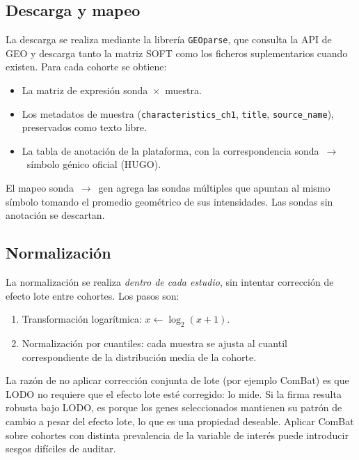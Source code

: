 \subsection{Descarga y mapeo}
\label{sec:descarga}

La descarga se realiza mediante la librería \texttt{GEOparse}, que consulta
la API de GEO y descarga tanto la matriz SOFT como los ficheros
suplementarios cuando existen. Para cada cohorte se obtiene:

\begin{itemize}
  \item La matriz de expresión sonda~$\times$~muestra.
  \item Los metadatos de muestra (\texttt{characteristics\_ch1},
  \texttt{title}, \texttt{source\_name}), preservados como texto libre.
  \item La tabla de anotación de la plataforma, con la correspondencia
  sonda~$\to$~símbolo génico oficial (HUGO).
\end{itemize}

El mapeo sonda~$\to$~gen agrega las sondas múltiples que apuntan al mismo
símbolo tomando el promedio geométrico de sus intensidades. Las sondas sin
anotación se descartan.

\subsection{Normalización}
\label{sec:normalizacion}

La normalización se realiza \emph{dentro de cada estudio}, sin intentar
corrección de efecto lote entre cohortes. Los pasos son:

\begin{enumerate}
  \item Transformación logarítmica: $x \gets \log_2(x + 1)$.
  \item Normalización por cuantiles: cada muestra se ajusta al cuantil
  correspondiente de la distribución media de la cohorte.
\end{enumerate}

La razón de no aplicar corrección conjunta de lote (por ejemplo ComBat) es
que LODO no requiere que el efecto lote esté corregido: lo mide. Si la
firma resulta robusta bajo LODO, es porque los genes seleccionados
mantienen su patrón de cambio a pesar del efecto lote, lo que es una
propiedad deseable. Aplicar ComBat sobre cohortes con distinta prevalencia
de la variable de interés puede introducir sesgos difíciles de auditar.


